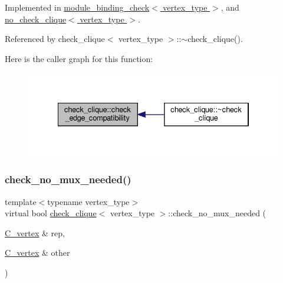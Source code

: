 Implemented in \hyperlink{structmodule__binding__check_a36a3f9d2c01d19f8a3d4b0a2bbc0d021}{module\+\_\+binding\+\_\+check$<$ vertex\+\_\+type $>$}, and \hyperlink{structno__check__clique_a8b4c77a0a9cf081c5698aed9a190a5fb}{no\+\_\+check\+\_\+clique$<$ vertex\+\_\+type $>$}.



Referenced by check\+\_\+clique$<$ vertex\+\_\+type $>$\+::$\sim$check\+\_\+clique().

Here is the caller graph for this function\+:
\nopagebreak
\begin{figure}[H]
\begin{center}
\leavevmode
\includegraphics[width=334pt]{d9/d11/structcheck__clique_a5d5ad28e723a12d105f578360959ec53_icgraph}
\end{center}
\end{figure}
\mbox{\label{structcheck__clique_ad6179189438c0cf415aa52e9c831e854}} 
\subsubsection{\texorpdfstring{check\+\_\+no\+\_\+mux\+\_\+needed()}{check\_no\_mux\_needed()}}
{\footnotesize\ttfamily template$<$typename vertex\+\_\+type$>$ \\
virtual bool \hyperlink{structcheck__clique}{check\+\_\+clique}$<$ vertex\+\_\+type $>$\+::check\+\_\+no\+\_\+mux\+\_\+needed (\begin{DoxyParamCaption}\item[{\hyperlink{clique__covering__graph_8hpp_a9cb45047ea8c5ed95a8cfa90494345aa}{C\+\_\+vertex} \&}]{rep,  }\item[{\hyperlink{clique__covering__graph_8hpp_a9cb45047ea8c5ed95a8cfa90494345aa}{C\+\_\+vertex} \&}]{other }\end{DoxyParamCaption})\hspace{0.3cm}{\ttfamily [pure virtual]}}



